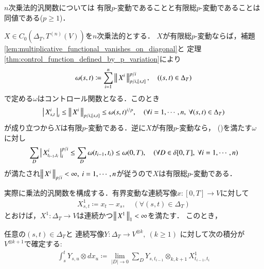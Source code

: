 	\begin{screen}
		\begin{thm}\label{thm:fin_p_var_and_fin_ttl_p_var_is_equiv_for_multiplicative}
			$n$次乗法的汎関数については
			有限$p$-変動であることと有限総$p$-変動であることは同値である($p \geq 1$)．
		\end{thm}
	\end{screen}
	
	\begin{prf}
		$X \in C_0 \left(\Delta_T,T^{(n)}(V) \right)$を$n$次乗法的とする．
		$X$が有限総$p$-変動ならば，補題\ref{lem:multiplicative_functional_vanishes_on_diagonal}と
		定理\ref{thm:control_function_defined_by_p_variation}により
		\begin{align}
			\omega(s,t) \coloneqq \sum_{i=1}^n \left\|\, X^i\, \right\|_{p/i,[s,t]}^{p/i},
			\quad ((s,t) \in \Delta_T)
		\end{align}
		で定める$\omega$はコントロール関数となる．このとき
		\begin{align}
			\left|\, X^i_{s,t}\, \right|_{i}
			\leq \left\|\, X^i\, \right\|_{p/i,[s,t]}
			\leq \omega(s,t)^{i/p},
			\quad (\forall i = 1,\cdots,n,\ \forall (s,t) \in \Delta_T)
		\end{align}
		が成り立つから$X$は有限$p$-変動である．逆に$X$が有限$p$-変動なら，
		()を満たす$\omega$に対し
		\begin{align}
			\sum_D \left|\, X^i_{t_{i-1},t_i}\, \right|_{i}^{p/i}
			\leq \sum_D \omega(t_{i-1},t_i)
			\leq \omega(0,T),
			\quad (\forall D \in \delta[0,T],\ \forall i=1,\cdots,n)
		\end{align}
		が満たされ$\Norm{X^i}{p/i} < \infty,\ i=1,\cdots,n$が従うので$X$は有限総$p$-変動である．
		\QED
	\end{prf}
	
	実際に乗法的汎関数を構成する．有界変動な連続写像$x:[0,T] \longrightarrow V$に対して
	\begin{align}
		X^1_{s,t} \coloneqq x_t - x_s,
		\quad (\forall (s,t) \in \Delta_T)
	\end{align}
	とおけば，$X^1:\Delta_T \longrightarrow V$は連続かつ$\left\|\, X^1\, \right\|_{1} < \infty$を満たす．
	このとき，
	\begin{screen}
		\begin{lem}\label{lem:def_integration_of_continuous_mapping_by_X_1}
			任意の$(s,t) \in \Delta_T$と
			連続写像$Y:\Delta_T \longrightarrow V^{\otimes k},\ (k \geq 1)$
			に対して次の積分が$V^{\otimes k+1}$で確定する:
			\begin{align}
				\int_s^t Y_{s,u} \otimes d x_u
				\coloneqq \lim_{|D| \to 0} \sum_{D} Y_{s,t_{i-1}} \otimes_{k,k+1} X^1_{t_{i-1},t_i}
				\label{eq:def_integration_of_continuous_mapping_by_X_1}
			\end{align}
		\end{lem}
	\end{screen}
	
